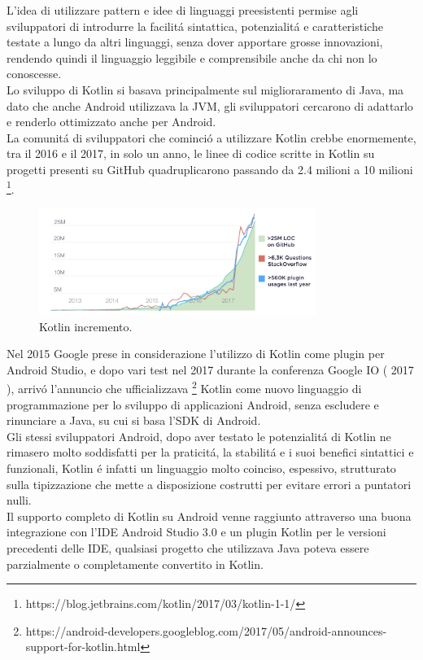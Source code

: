L'idea di utilizzare pattern e idee di linguaggi preesistenti permise agli sviluppatori di introdurre la facilit\'a sintattica, potenzialit\'a e caratteristiche testate a lungo da altri linguaggi, senza dover apportare grosse innovazioni, rendendo quindi il linguaggio leggibile e comprensibile anche da chi non lo conoscesse.\\
Lo sviluppo di Kotlin si basava principalmente sul miglioraramento di Java, ma dato che anche Android utilizzava la JVM, gli sviluppatori cercarono di adattarlo e renderlo ottimizzato anche per Android.\\
La comunit\'a di sviluppatori che cominci\'o a utilizzare Kotlin crebbe enormemente, tra il 2016 e il 2017, in solo un anno, le linee di codice scritte in Kotlin su progetti presenti su GitHub quadruplicarono passando da 2.4 milioni a 10 milioni \footnote{https://blog.jetbrains.com/kotlin/2017/03/kotlin-1-1/}. \\

\begin{figure}[!hb]
  \centering
  \includegraphics[width=0.8\textwidth]{immagini/kotlin_grafico_incremento.png}
  \caption{Kotlin incremento.}
  \label{fig:Kotlin incremento}
\end{figure}

Nel 2015 Google prese in considerazione l'utilizzo di Kotlin come plugin per Android Studio, e dopo vari test nel 2017 durante la conferenza Google IO ( 2017 ), arriv\'o l'annuncio che ufficializzava \footnote{https://android-developers.googleblog.com/2017/05/android-announces-support-for-kotlin.html} Kotlin come nuovo linguaggio di programmazione per lo sviluppo di applicazioni Android, senza escludere e rinunciare a Java, su cui si basa l'SDK di Android.\\
Gli stessi sviluppatori Android, dopo aver testato le potenzialit\'a di Kotlin ne rimasero molto soddisfatti per la praticit\'a, la stabilit\'a e i suoi benefici sintattici e funzionali, Kotlin \'e infatti un linguaggio molto coinciso, espessivo, strutturato sulla tipizzazione che mette a disposizione costrutti per evitare errori a puntatori nulli.\\
Il supporto completo di Kotlin su Android venne raggiunto attraverso una buona integrazione con l'IDE Android Studio 3.0 e un plugin Kotlin per le versioni precedenti delle IDE, qualsiasi progetto che utilizzava Java poteva essere parzialmente o completamente convertito in Kotlin.





